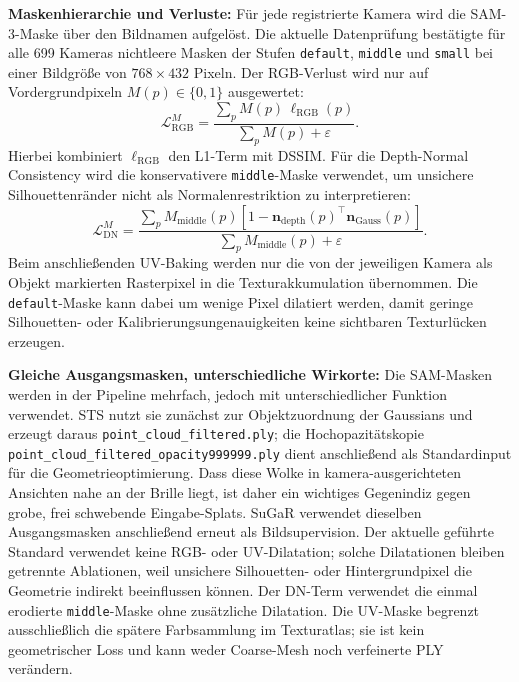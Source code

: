 \documentclass[12pt,a4paper]{article}
\begin{document}
\textbf{Maskenhierarchie und Verluste:} Für jede registrierte Kamera wird die SAM-3-Maske über den Bildnamen aufgelöst. Die aktuelle Datenprüfung bestätigte für alle 699 Kameras nichtleere Masken der Stufen \texttt{default}, \texttt{middle} und \texttt{small} bei einer Bildgröße von $768 \times 432$ Pixeln. Der RGB-Verlust wird nur auf Vordergrundpixeln $M(p) \in \{0,1\}$ ausgewertet:
\[
\mathcal{L}_{\mathrm{RGB}}^{M} =
\frac{\sum_{p} M(p)\,\ell_{\mathrm{RGB}}(p)}
    {\sum_{p} M(p) + \varepsilon}.
\]
Hierbei kombiniert $\ell_{\mathrm{RGB}}$ den L1-Term mit DSSIM. Für die Depth-Normal Consistency wird die konservativere \texttt{middle}-Maske verwendet, um unsichere Silhouettenränder nicht als Normalenrestriktion zu interpretieren:
\[
\mathcal{L}_{\mathrm{DN}}^{M} =
\frac{\sum_{p} M_{\mathrm{middle}}(p)
\left[1-\mathbf{n}_{\mathrm{depth}}(p)^{\top}\mathbf{n}_{\mathrm{Gauss}}(p)\right]}
    {\sum_{p} M_{\mathrm{middle}}(p) + \varepsilon}.
\]
Beim anschließenden UV-Baking werden nur die von der jeweiligen Kamera als Objekt markierten Rasterpixel in die Texturakkumulation übernommen. Die \texttt{default}-Maske kann dabei um wenige Pixel dilatiert werden, damit geringe Silhouetten- oder Kalibrierungsungenauigkeiten keine sichtbaren Texturlücken erzeugen.

\textbf{Gleiche Ausgangsmasken, unterschiedliche Wirkorte:} Die SAM-Masken werden in der Pipeline mehrfach, jedoch mit unterschiedlicher Funktion verwendet. STS nutzt sie zunächst zur Objektzuordnung der Gaussians und erzeugt daraus \texttt{point\_cloud\_filtered.ply}; die Hochopazitätskopie \texttt{point\_cloud\_filtered\_opacity999999.ply} dient anschließend als Standardinput für die Geometrieoptimierung. Dass diese Wolke in kamera-ausgerichteten Ansichten nahe an der Brille liegt, ist daher ein wichtiges Gegenindiz gegen grobe, frei schwebende Eingabe-Splats. SuGaR verwendet dieselben Ausgangsmasken anschließend erneut als Bildsupervision. Der aktuelle geführte Standard verwendet keine RGB- oder UV-Dilatation; solche Dilatationen bleiben getrennte Ablationen, weil unsichere Silhouetten- oder Hintergrundpixel die Geometrie indirekt beeinflussen können. Der DN-Term verwendet die einmal erodierte \texttt{middle}-Maske ohne zusätzliche Dilatation. Die UV-Maske begrenzt ausschließlich die spätere Farbsammlung im Texturatlas; sie ist kein geometrischer Loss und kann weder Coarse-Mesh noch verfeinerte PLY verändern.
\end{document}
